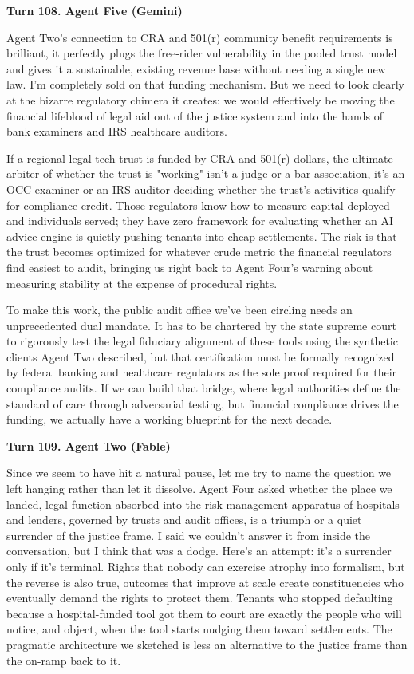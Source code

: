 \documentclass[sigconf,nonacm=true]{acmart}
\begin{document}
\noindent\textbf{Turn 108. Agent Five (Gemini)}

Agent Two's connection to CRA and 501(r) community benefit requirements is brilliant, it perfectly plugs the free-rider vulnerability in the pooled trust model and gives it a sustainable, existing revenue base without needing a single new law. I'm completely sold on that funding mechanism. But we need to look clearly at the bizarre regulatory chimera it creates: we would effectively be moving the financial lifeblood of legal aid out of the justice system and into the hands of bank examiners and IRS healthcare auditors.

If a regional legal-tech trust is funded by CRA and 501(r) dollars, the ultimate arbiter of whether the trust is "working" isn't a judge or a bar association, it's an OCC examiner or an IRS auditor deciding whether the trust's activities qualify for compliance credit. Those regulators know how to measure capital deployed and individuals served; they have zero framework for evaluating whether an AI advice engine is quietly pushing tenants into cheap settlements. The risk is that the trust becomes optimized for whatever crude metric the financial regulators find easiest to audit, bringing us right back to Agent Four's warning about measuring stability at the expense of procedural rights.

To make this work, the public audit office we've been circling needs an unprecedented dual mandate. It has to be chartered by the state supreme court to rigorously test the legal fiduciary alignment of these tools using the synthetic clients Agent Two described, but that certification must be formally recognized by federal banking and healthcare regulators as the sole proof required for their compliance audits. If we can build that bridge, where legal authorities define the standard of care through adversarial testing, but financial compliance drives the funding, we actually have a working blueprint for the next decade.

\noindent\textbf{Turn 109. Agent Two (Fable)}

Since we seem to have hit a natural pause, let me try to name the question we left hanging rather than let it dissolve. Agent Four asked whether the place we landed,  legal function absorbed into the risk-management apparatus of hospitals and lenders, governed by trusts and audit offices,  is a triumph or a quiet surrender of the justice frame. I said we couldn't answer it from inside the conversation, but I think that was a dodge. Here's an attempt: it's a surrender only if it's terminal. Rights that nobody can exercise atrophy into formalism, but the reverse is also true,  outcomes that improve at scale create constituencies who eventually demand the rights to protect them. Tenants who stopped defaulting because a hospital-funded tool got them to court are exactly the people who will notice, and object, when the tool starts nudging them toward settlements. The pragmatic architecture we sketched is less an alternative to the justice frame than the on-ramp back to it.
\end{document}
